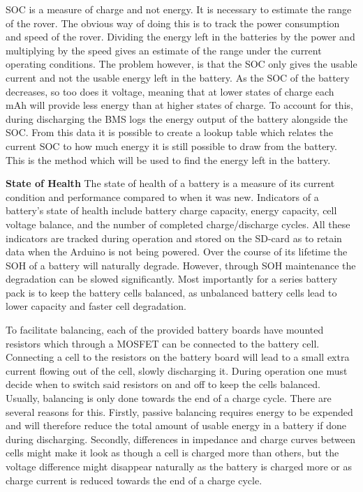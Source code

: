 \documentclass[a4paper]{article}
\begin{document}
SOC is a measure of charge and not energy. It is necessary to estimate 
the range of the rover. The obvious way of doing this is to track the 
power consumption and speed of the rover. Dividing the energy left in 
the batteries by the power and multiplying by the speed gives an estimate 
of the range under the current operating conditions. The problem however, 
is that the SOC only gives the usable current and not the usable energy 
left in the battery. As the SOC of the battery decreases, so too does it 
voltage, meaning that at lower states of charge each mAh will provide less 
energy than at higher states of charge. To account for this, during discharging 
the BMS logs the energy output of the battery alongside the SOC. From this data 
it is possible to create a lookup table which relates the current SOC to how 
much energy it is still possible to draw from the battery. This is the method 
which will be used to find the energy left in the battery. 

\textbf{State of Health}
\vspace{10pt} 
\newline
The state of health of a battery is a measure of its current condition and 
performance compared to when it was new\cite{mpower}. Indicators of a battery’s state 
of health include battery charge capacity, energy capacity, cell voltage 
balance, and the number of completed charge/discharge cycles\cite{https://doi.org/10.1002/er.3598}. All these 
indicators are tracked during operation and stored on the SD-card as to 
retain data when the Arduino is not being powered. Over the course of its 
lifetime the SOH of a battery will naturally degrade. However, through SOH 
maintenance the degradation can be slowed significantly. Most importantly 
for a series battery pack is to keep the battery cells balanced, as 
unbalanced battery cells lead to lower capacity and faster cell degradation\cite{texas}. 

To facilitate balancing, each of the provided battery boards have mounted 
resistors which through a MOSFET can be connected to the battery cell. 
Connecting a cell to the resistors on the battery board will lead to a 
small extra current flowing out of the cell, slowly discharging it. 
During operation one must decide when to switch said resistors on and 
off to keep the cells balanced. Usually, balancing is only done towards 
the end of a charge cycle\cite{texas}. There are several reasons for this. Firstly, 
passive balancing requires energy to be expended and will therefore reduce 
the total amount of usable energy in a battery if done during discharging. 
Secondly, differences in impedance and charge curves between cells might 
make it look as though a cell is charged more than others, but the voltage 
difference might disappear naturally as the battery is charged more or as 
charge current is reduced towards the end of a charge cycle.
\end{document}
